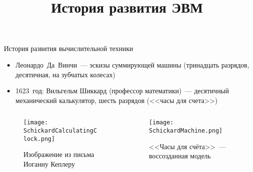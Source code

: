 \documentclass[aspectratio=169,14pt]{beamer}
\title{История развития ЭВМ}
\begin{document}
\begin{frame}{История развития вычислительной техники}
    \begin{itemize}
        \item Леонардо~Да~Винчи~--- эскизы суммирующей машины (тринадцать разрядов, десятичная, на зубчатых колесах)
        \pause
        \item 1623~год: Вильгельм Шиккард (профессор математики)~--- десятичный механический калькулятор, шесть разрядов (<<часы для счета>>)
    \end{itemize}
    \begin{columns}[T,onlytextwidth]
        \begin{column}{0.5\textwidth}
            \begin{figure}[htp]
                \centering
                \texttt{[image: SchickardCalculatingClock.png]}
                \caption{\tiny{Изображение из письма Иоганну Кеплеру}}
                \label{fig:SchickardCalculatingClock}
            \end{figure}
        \end{column}
        \begin{column}{0.5\textwidth}
            \begin{figure}[htp]
                \centering
                \texttt{[image: SchickardMachine.png]}
                \caption{\tiny{<<Часы для счёта>>~--- воссозданная модель}}
                \label{fig:SchickardMachine}
            \end{figure}
        \end{column}
    \end{columns}
\end{frame}
\end{document}
